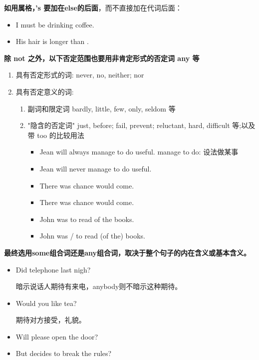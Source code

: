 \textbf{如用属格，'s 要加在else的后面}，而不直接加在代词后面：
\begin{itemize}
\item I must be drinking  coffee.
\item His hair is longer than .
\end{itemize}

\textbf{除 not 之外，以下否定范围也要用非肯定形式的否定词 any 等}
\begin{enumerate}
\item 具有否定形式的词: never, no, neither; nor
\item 具有否定意义的词:
  \begin{enumerate}
  \item 副词和限定词 bardly, little, few, only, seldom 等
  \item "隐含的否定词" just, before; fail, prevent; reluctant, hard, difficult
    等;以及带 too 的比较用法
    \begin{itemize}
    \item Jean will always manage to do  useful. manage to do:
      设法做某事
    \item Jean will never manage to do  useful.
    \item There was  chance  would come.
    \item There was  chance  would come.
    \item John was  to read  of the books.
    \item John was / to read  (of the) books.
    \end{itemize}
  \end{enumerate}
\end{enumerate}

\textbf{最终选用some组合词还是any组合词，取决于整个句子的内在含义或基本含义。}
\begin{itemize}
\item Did  telephone last nigh?

  暗示说话人期待有来电，anybody则不暗示这种期待。

\item Would you like  tea?

  期待对方接受，礼貌。

\item Will  please open the door?


\item But   decides to break the
  rules?
\end{itemize}

